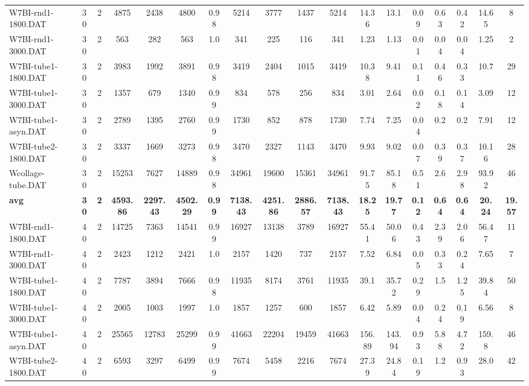 \begin{sidewaystable}[h]
{\begin{tabular}{lccccccccccccccccc}
W7BI-rnd1-1800.DAT & 30 & 2 & 4875 & 2438 & 4800 & 0.98 & 5214 & 3777 & 1437 & 5214 & 14.36 & 13.1 & 0.09 & 0.63 & 0.42 & 14.65 & 8\\
W7BI-rnd1-3000.DAT & 30 & 2 & 563 & 282 & 563 & 1.0 & 341 & 225 & 116 & 341 & 1.23 & 1.13 & 0.01 & 0.04 & 0.04 & 1.25 & 2\\
W7BI-tube1-1800.DAT & 30 & 2 & 3983 & 1992 & 3891 & 0.98 & 3419 & 2404 & 1015 & 3419 & 10.38 & 9.41 & 0.11 & 0.46 & 0.33 & 10.7 & 29\\
W7BI-tube1-3000.DAT & 30 & 2 & 1357 & 679 & 1340 & 0.99 & 834 & 578 & 256 & 834 & 3.01 & 2.64 & 0.02 & 0.18 & 0.14 & 3.09 & 12\\
W7BI-tube1-asyn.DAT & 30 & 2 & 2789 & 1395 & 2760 & 0.99 & 1730 & 852 & 878 & 1730 & 7.74 & 7.25 & 0.04 & 0.2 & 0.2 & 7.91 & 12\\
W7BI-tube2-1800.DAT & 30 & 2 & 3337 & 1669 & 3273 & 0.98 & 3470 & 2327 & 1143 & 3470 & 9.93 & 9.02 & 0.07 & 0.39 & 0.37 & 10.16 & 28\\
Wcollage-tube.DAT & 30 & 2 & 15253 & 7627 & 14889 & 0.98 & 34961 & 19600 & 15361 & 34961 & 91.75 & 85.18 & 0.51 & 2.6 & 2.98 & 93.92 & 46\\
\cline{1-18} \textbf{avg} & \textbf{30} & \textbf{2} & \textbf{4593.86} & \textbf{2297.43} & \textbf{4502.29} & \textbf{0.99} & \textbf{7138.43} & \textbf{4251.86} & \textbf{2886.57} & \textbf{7138.43} & \textbf{18.25} & \textbf{19.77} & \textbf{0.12} & \textbf{0.64} & \textbf{0.64} & \textbf{20.24} & \textbf{19.57} \\ \cline{1-18}
W7BI-rnd1-1800.DAT & 40 & 2 & 14725 & 7363 & 14541 & 0.99 & 16927 & 13138 & 3789 & 16927 & 55.41 & 50.06 & 0.43 & 2.39 & 2.06 & 56.47 & 11\\
W7BI-rnd1-3000.DAT & 40 & 2 & 2423 & 1212 & 2421 & 1.0 & 2157 & 1420 & 737 & 2157 & 7.52 & 6.84 & 0.05 & 0.33 & 0.24 & 7.65 & 7\\
W7BI-tube1-1800.DAT & 40 & 2 & 7787 & 3894 & 7666 & 0.98 & 11935 & 8174 & 3761 & 11935 & 39.1 & 35.72 & 0.29 & 1.5 & 1.25 & 39.84 & 50\\
W7BI-tube1-3000.DAT & 40 & 2 & 2005 & 1003 & 1997 & 1.0 & 1857 & 1257 & 600 & 1857 & 6.42 & 5.89 & 0.04 & 0.24 & 0.19 & 6.56 & 8\\
W7BI-tube1-asyn.DAT & 40 & 2 & 25565 & 12783 & 25299 & 0.99 & 41663 & 22204 & 19459 & 41663 & 156.89 & 143.94 & 0.93 & 5.88 & 4.72 & 159.8 & 46\\
W7BI-tube2-1800.DAT & 40 & 2 & 6593 & 3297 & 6499 & 0.99 & 7674 & 5458 & 2216 & 7674 & 27.39 & 24.84 & 0.19 & 1.2 & 0.93 & 28.0 & 42\\

\end{tabular}}
\end{sidewaystable}
